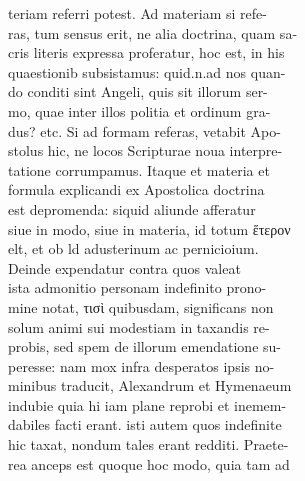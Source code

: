 \documentclass{article}
\begin{document}
\begin{pages}
                teriam referri potest. Ad materiam si refe- \\
                ras, tum sensus erit, ne alia doctrina, quam sa- \\
                cris literis expressa proferatur, hoc est, in his \\
                quaestionib subsistamus: quid.n.ad nos quan- \\
                do conditi sint Angeli, quis sit illorum ser- \\
                mo, quae inter illos politia et ordinum gra- \\
                dus? etc. Si ad formam referas, vetabit Apo- \\
                stolus hic, ne locos Scripturae noua interpre- \\
                tatione corrumpamus. Itaque et materia et \\
                formula explicandi ex Apostolica doctrina \\
                est depromenda: siquid aliunde afferatur \\
                siue in modo, siue in materia, id totum ἕτερον \\
                elt, et ob ld adusterinum ac pernicioium. \\
                Deinde expendatur contra quos valeat \\
                ista admonitio personam indefinito prono- \\
                mine notat, τισὶ quibusdam, significans non \\
                solum animi sui modestiam in taxandis re- \\
                probis, sed spem de illorum emendatione su- \\
                peresse: nam mox infra desperatos ipsis no- \\
                minibus traducit, Alexandrum et Hymenaeum \\
                indubie quia hi iam plane reprobi et inemem- \\
                dabiles facti erant. isti autem quos indefinite \\
                hic taxat, nondum tales erant redditi. Praete- \\
                rea anceps est quoque hoc modo, quia tam ad \\

\end{pages}
\end{document}
